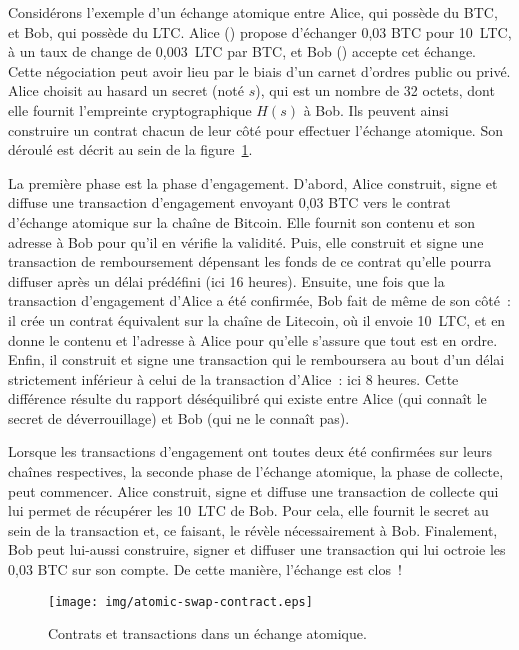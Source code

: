 Considérons l'exemple d'un échange atomique entre Alice, qui possède du BTC, et Bob, qui possède du LTC. Alice () propose d'échanger 0,03 BTC pour 10~LTC, à un taux de change de 0,003~LTC par BTC, et Bob () accepte cet échange. Cette négociation peut avoir lieu par le biais d'un carnet d'ordres public ou privé. Alice choisit au hasard un secret (noté $s$), qui est un nombre de 32 octets, dont elle fournit l'empreinte cryptographique $H(s)$ à Bob. Ils peuvent ainsi construire un contrat chacun de leur côté pour effectuer l'échange atomique. Son déroulé est décrit au sein de la figure~\ref{fig:atomic-swap-contract}.

La première phase est la phase d'engagement. D'abord, Alice construit, signe et diffuse une transaction d'engagement envoyant 0,03 BTC vers le contrat d'échange atomique sur la chaîne de Bitcoin. Elle fournit son contenu et son adresse à Bob pour qu'il en vérifie la validité. Puis, elle construit et signe une transaction de remboursement dépensant les fonds de ce contrat qu'elle pourra diffuser après un délai prédéfini (ici 16 heures). Ensuite, une fois que la transaction d'engagement d'Alice a été confirmée, Bob fait de même de son côté~: il crée un contrat équivalent sur la chaîne de Litecoin, où il envoie 10~LTC, et en donne le contenu et l'adresse à Alice pour qu'elle s'assure que tout est en ordre. Enfin, il construit et signe une transaction qui le remboursera au bout d'un délai strictement inférieur à celui de la transaction d'Alice~: ici 8 heures. Cette différence résulte du rapport déséquilibré qui existe entre Alice (qui connaît le secret de déverrouillage) et Bob (qui ne le connaît pas).

Lorsque les transactions d'engagement ont toutes deux été confirmées sur leurs chaînes respectives, la seconde phase de l'échange atomique, la phase de collecte, peut commencer. Alice construit, signe et diffuse une transaction de collecte qui lui permet de récupérer les 10~LTC de Bob. Pour cela, elle fournit le secret au sein de la transaction et, ce faisant, le révèle nécessairement à Bob. Finalement, Bob peut lui-aussi construire, signer et diffuser une transaction qui lui octroie les 0,03 BTC sur son compte. De cette manière, l'échange est clos~!

\begin{figure}[ht]
  \centering
  \texttt{[image: img/atomic-swap-contract.eps]}
  \caption{Contrats et transactions dans un échange atomique.}
  \label{fig:atomic-swap-contract}
\end{figure}

